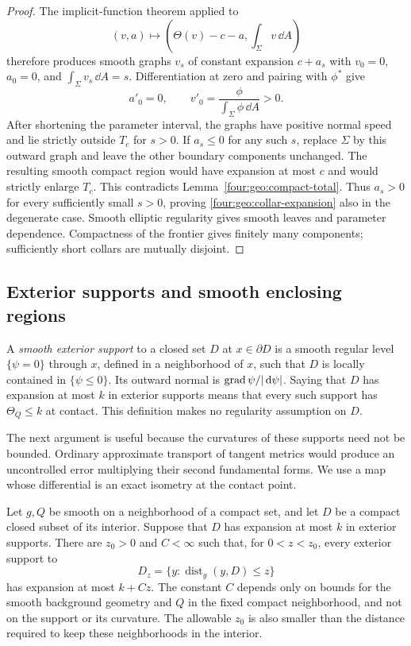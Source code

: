 \begin{proof}
The implicit-function theorem applied to
\[
 (v,a)\longmapsto
 \left(\Theta(v)-c-a,\int_\Sigma v\,\dd A\right)
\]
therefore produces smooth graphs $v_s$ of constant expansion $c+a_s$ with
$v_0=0$, $a_0=0$, and $\int_\Sigma v_s\,\dd A=s$.  Differentiation at zero
and pairing with $\phi^*$ give
\[
 a'_0=0,\qquad v'_0=\frac{\phi}{\int_\Sigma\phi\,\dd A}>0.
\]
After shortening the parameter interval, the graphs have positive normal
speed and lie strictly outside $T_c$ for $s>0$.  If $a_s\le0$ for any such
$s$, replace $\Sigma$ by this outward graph and leave the other boundary
components unchanged.  The resulting smooth compact region would have
expansion at most $c$ and would strictly enlarge $T_c$.  This contradicts
Lemma~\ref{four:geo:compact-total}.  Thus $a_s>0$ for every sufficiently small
$s>0$, proving \eqref{four:geo:collar-expansion} also in the degenerate case.
Smooth elliptic regularity gives smooth leaves and parameter dependence.
Compactness of the frontier gives finitely many components; sufficiently
short collars are mutually disjoint.
\end{proof}

\subsection{Exterior supports and smooth enclosing regions}

A \emph{smooth exterior support} to a closed set $D$ at
$x\in\partial D$ is a smooth regular level $\{\psi=0\}$ through $x$,
defined in a neighborhood of $x$, such that $D$ is locally contained in
$\{\psi\le0\}$.  Its outward normal is $\operatorname{grad}\psi/|\,\mathrm d\psi|$.  Saying
that $D$ has expansion at most $k$ in exterior supports means that every
such support has $\Theta_Q\le k$ at contact.  This definition makes no
regularity assumption on $D$.

The next argument is useful because the curvatures of these supports need
not be bounded.  Ordinary approximate transport of tangent metrics would
produce an uncontrolled error multiplying their second fundamental forms.
We use a map whose differential is an exact isometry at the contact point.

\begin{lemma}\label{four:geo:support-transport}
Let $g,Q$ be smooth on a neighborhood of a compact set, and let $D$ be a
compact closed subset of its interior.  Suppose that $D$ has expansion at
most $k$ in exterior supports.  There are $z_0>0$ and $C<\infty$ such that,
for $0<z<z_0$, every exterior support to
\[
 D_z=\{y:\operatorname{dist}_g(y,D)\le z\}
\]
has expansion at most $k+Cz$.  The constant $C$ depends only on bounds for
the smooth background geometry and $Q$ in the fixed compact neighborhood,
and not on the support or its curvature.  The allowable $z_0$ is also
smaller than the distance required to keep these neighborhoods in the
interior.
\end{lemma}

